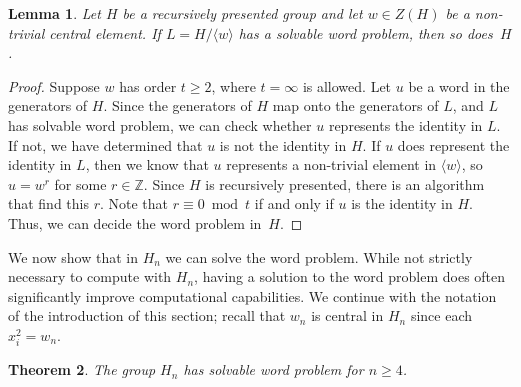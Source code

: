 \documentclass[11pt]{amsart}
\theoremstyle{mythm}
\newtheorem{theorem}{Theorem}[section]
\newtheorem{lemma}[theorem]{Lemma}
\theoremstyle{mydef}
\theoremstyle{myrem}
\numberwithin{equation}{section}
\renewcommand{\geq}{\geqslant}
\newcommand{\la}{\langle}
\newcommand{\ra}{\rangle}
\newcommand{\ZZ}{{\mathbb{Z}}}
\begin{document}
\begin{lemma} \label{lem: rec presented} Let $H$ be a recursively presented group and let   $w\in Z(H)$  be a non-trivial central element. If $L= H/\la w \ra$ has a solvable word problem, then so does~$H$.
\end{lemma}
\begin{proof}  Suppose $w$ has order $t\geq 2$, where $t=\infty$ is allowed.  Let $u$ be a word in the generators of $H$. Since the generators of $H$ map onto the generators of $L$, and $L$ has solvable word problem, we can check whether $u$ represents the identity in $L$. If not, we have determined that $u$ is not the identity in $H$. If $u$ does represent the identity in $L$, then we know that $u$ represents a non-trivial element in $\langle w\rangle$, so $u=w^r$ for some  $r\in \ZZ$.  Since $H$ is recursively presented, there is an algorithm that find this $r$. Note that  $r\equiv 0\bmod t$ if and only if $u$ is the identity in $H$. Thus,  we can decide the word problem in~$H$. 
  \end{proof}  

We now show that in $H_n$ we can solve the word problem. While not strictly necessary to compute with $H_n$, having a solution to the word problem does often significantly improve computational capabilities. We continue with the notation of the introduction of this section; recall that $w_n$ is central in $H_n$ since  each $x_i^2=w_n$.

  \begin{theorem}\label{Hn_solv_wp} The group $H_n$ has solvable word problem for $n\geq 4$. \end{theorem}
  
\end{document}
